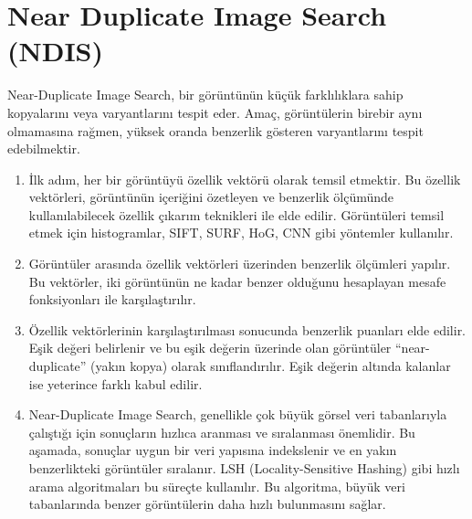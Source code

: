\section{Near Duplicate Image Search (NDIS)}

Near-Duplicate Image Search, bir görüntünün küçük farklılıklara sahip kopyalarını veya varyantlarını tespit eder. Amaç, görüntülerin birebir aynı olmamasına rağmen, yüksek oranda benzerlik gösteren varyantlarını tespit edebilmektir.

\begin{enumerate}
    \item İlk adım, her bir görüntüyü özellik vektörü olarak temsil etmektir. Bu özellik vektörleri, görüntünün içeriğini özetleyen ve benzerlik ölçümünde kullanılabilecek özellik çıkarım teknikleri ile elde edilir. Görüntüleri temsil etmek için histogramlar, SIFT, SURF, HoG, CNN gibi yöntemler kullanılır.
    \item Görüntüler arasında özellik vektörleri üzerinden benzerlik ölçümleri yapılır. Bu vektörler, iki görüntünün ne kadar benzer olduğunu hesaplayan mesafe fonksiyonları ile karşılaştırılır.
    \item Özellik vektörlerinin karşılaştırılması sonucunda benzerlik puanları elde edilir. Eşik değeri belirlenir ve bu eşik değerin üzerinde olan görüntüler “near-duplicate” (yakın kopya) olarak sınıflandırılır. Eşik değerin altında kalanlar ise yeterince farklı kabul edilir.
    \item Near-Duplicate Image Search, genellikle çok büyük görsel veri tabanlarıyla çalıştığı için sonuçların hızlıca aranması ve sıralanması önemlidir. Bu aşamada, sonuçlar uygun bir veri yapısına indekslenir ve en yakın benzerlikteki görüntüler sıralanır. LSH (Locality-Sensitive Hashing) gibi hızlı arama algoritmaları bu süreçte kullanılır. Bu algoritma, büyük veri tabanlarında benzer görüntülerin daha hızlı bulunmasını sağlar.
\end{enumerate}

\newpage